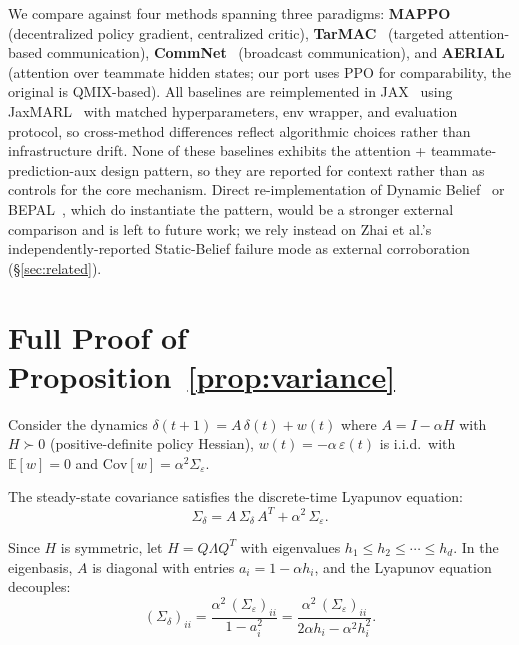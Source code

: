 \documentclass{article}
\theoremstyle{plain}
\theoremstyle{definition}
\theoremstyle{remark}
\begin{document}
We compare against four methods spanning three paradigms:
\textbf{MAPPO}~\cite{yu2022surprising} (decentralized policy
gradient, centralized critic),
\textbf{TarMAC}~\cite{das2019tarmac} (targeted
attention-based communication),
\textbf{CommNet}~\cite{sukhbaatar2016commnet} (broadcast
communication), and \textbf{AERIAL}~\cite{phan2023attention}
(attention over teammate hidden states; our port uses PPO for
comparability, the original is QMIX-based). All baselines are
reimplemented in JAX~\cite{bradbury2018jax} using
JaxMARL~\cite{rutherford2024jaxmarl} with matched hyperparameters,
env wrapper, and evaluation protocol, so cross-method differences
reflect algorithmic choices rather than infrastructure drift.
None of these baselines exhibits the attention +
teammate-prediction-aux design pattern, so they are reported for
context rather than as controls for the core mechanism. Direct re-implementation of Dynamic
Belief~\cite{zhai2023dynamic} or BEPAL~\cite{huang2025bepal},
which do instantiate the pattern, would be a stronger external
comparison and is left to future work; we rely instead on
Zhai et al.'s independently-reported Static-Belief failure mode as
external corroboration (\S\ref{sec:related}).


\section{Full Proof of Proposition~\ref{prop:variance}}
\label{app:proof}

Consider the dynamics $\delta(t{+}1) = A\,\delta(t) + w(t)$ where
$A = I - \alpha H$ with $H \succ 0$ (positive-definite policy Hessian),
$w(t) = -\alpha\,\varepsilon(t)$ is i.i.d.\ with $\mathbb{E}[w] = 0$
and $\mathrm{Cov}[w] = \alpha^2 \Sigma_\varepsilon$.

The steady-state covariance satisfies the discrete-time Lyapunov equation:
\begin{equation}
    \Sigma_\delta = A\,\Sigma_\delta\,A^T + \alpha^2\,\Sigma_\varepsilon.
\end{equation}

Since $H$ is symmetric, let $H = Q \Lambda Q^T$ with eigenvalues
$h_1 \leq h_2 \leq \cdots \leq h_d$. In the eigenbasis, $A$ is diagonal
with entries $a_i = 1 - \alpha h_i$, and the Lyapunov equation decouples:
\begin{equation}
    (\Sigma_\delta)_{ii} = \frac{\alpha^2\,(\Sigma_\varepsilon)_{ii}}
                                 {1 - a_i^2}
    = \frac{\alpha^2\,(\Sigma_\varepsilon)_{ii}}
           {2\alpha h_i - \alpha^2 h_i^2}.
\end{equation}
\end{document}
